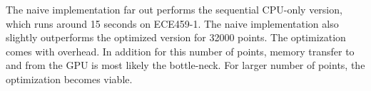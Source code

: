 \documentclass[12pt]{article}
\begin{document}
The naive implementation far out performs the sequential CPU-only version, which runs around 15 seconds on ECE459-1. The naive implementation also slightly outperforms the optimized version for 32000 points. The optimization comes with overhead. In addition for this number of points, memory transfer to and from the GPU is most likely
the bottle-neck. For larger number of points, the optimization becomes viable.
\end{document}
